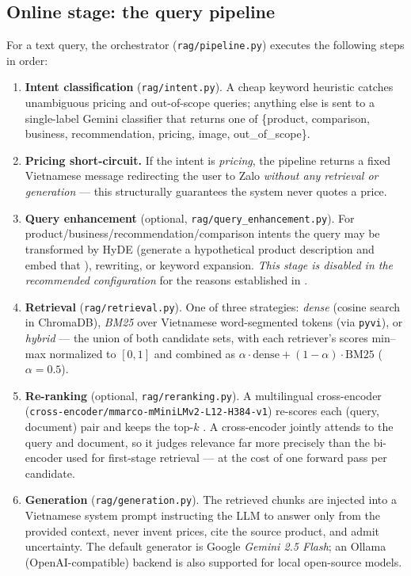 \subsection{Online stage: the query pipeline}
For a text query, the orchestrator (\texttt{rag/pipeline.py}) executes the
following steps in order:

\begin{enumerate}[leftmargin=1.5em,itemsep=3pt]
  \item \textbf{Intent classification} (\texttt{rag/intent.py}). A cheap keyword
        heuristic catches unambiguous pricing and out-of-scope queries; anything
        else is sent to a single-label Gemini classifier that returns one of
        \{product, comparison, business, recommendation, pricing, image,
        out\_of\_scope\}.
  \item \textbf{Pricing short-circuit.} If the intent is \textit{pricing}, the
        pipeline returns a fixed Vietnamese message redirecting the user to Zalo
        \emph{without any retrieval or generation} --- this structurally
        guarantees the system never quotes a price.
  \item \textbf{Query enhancement} (optional, \texttt{rag/query\_enhancement.py}).
        For product/business/recommendation/comparison intents the query may be
        transformed by HyDE (generate a hypothetical product description and
        embed that \cite{gao2023hyde}), rewriting, or keyword expansion.
        \emph{This stage is disabled in the recommended configuration} for the
        reasons established in .
  \item \textbf{Retrieval} (\texttt{rag/retrieval.py}). One of three strategies:
        \emph{dense} (cosine search in ChromaDB), \emph{BM25}
        \cite{robertson2009bm25} over Vietnamese word-segmented tokens (via
        \texttt{pyvi}), or \emph{hybrid} --- the union of both candidate sets,
        with each retriever's scores min--max normalized to $[0,1]$ and combined
        as $\alpha \cdot \text{dense} + (1-\alpha)\cdot\text{BM25}$
        ($\alpha=0.5$).
  \item \textbf{Re-ranking} (optional, \texttt{rag/reranking.py}). A multilingual
        cross-encoder (\texttt{cross-encoder/mmarco-mMiniLMv2-L12-H384-v1})
        re-scores each (query, document) pair and keeps the top-$k$
        \cite{nogueira2019passage}. A cross-encoder jointly attends to the query
        and document, so it judges relevance far more precisely than the
        bi-encoder used for first-stage retrieval --- at the cost of one forward
        pass per candidate.
  \item \textbf{Generation} (\texttt{rag/generation.py}). The retrieved chunks
        are injected into a Vietnamese system prompt instructing the LLM to
        answer only from the provided context, never invent prices, cite the
        source product, and admit uncertainty. The default generator is Google
        \textit{Gemini 2.5 Flash}; an Ollama (OpenAI-compatible) backend is also
        supported for local open-source models.
\end{enumerate}

